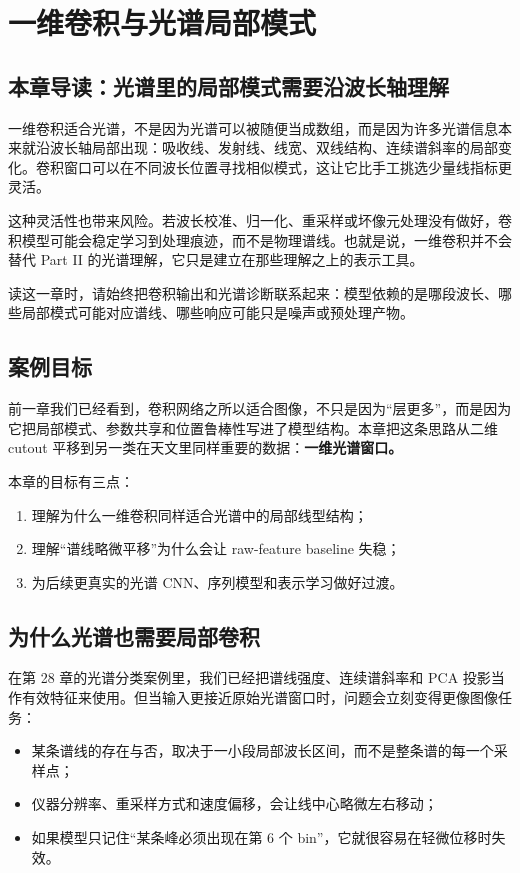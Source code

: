 \chapter{一维卷积与光谱局部模式}

\section{本章导读：光谱里的局部模式需要沿波长轴理解}

一维卷积适合光谱，不是因为光谱可以被随便当成数组，而是因为许多光谱信息本来就沿波长轴局部出现：吸收线、发射线、线宽、双线结构、连续谱斜率的局部变化。卷积窗口可以在不同波长位置寻找相似模式，这让它比手工挑选少量线指标更灵活。

这种灵活性也带来风险。若波长校准、归一化、重采样或坏像元处理没有做好，卷积模型可能会稳定学习到处理痕迹，而不是物理谱线。也就是说，一维卷积并不会替代 Part II 的光谱理解，它只是建立在那些理解之上的表示工具。

读这一章时，请始终把卷积输出和光谱诊断联系起来：模型依赖的是哪段波长、哪些局部模式可能对应谱线、哪些响应可能只是噪声或预处理产物。

\section{案例目标}

前一章我们已经看到，卷积网络之所以适合图像，不只是因为“层更多”，而是因为它把局部模式、参数共享和位置鲁棒性写进了模型结构。本章把这条思路从二维 cutout 平移到另一类在天文里同样重要的数据：\textbf{一维光谱窗口。}

本章的目标有三点：

\begin{enumerate}
    \item 理解为什么一维卷积同样适合光谱中的局部线型结构；
    \item 理解“谱线略微平移”为什么会让 raw-feature baseline 失稳；
    \item 为后续更真实的光谱 CNN、序列模型和表示学习做好过渡。
\end{enumerate}

\section{为什么光谱也需要局部卷积}

在第 28 章的光谱分类案例里，我们已经把谱线强度、连续谱斜率和 PCA 投影当作有效特征来使用。但当输入更接近原始光谱窗口时，问题会立刻变得更像图像任务：

\begin{itemize}
    \item 某条谱线的存在与否，取决于一小段局部波长区间，而不是整条谱的每一个采样点；
    \item 仪器分辨率、重采样方式和速度偏移，会让线中心略微左右移动；
    \item 如果模型只记住“某条峰必须出现在第 6 个 bin”，它就很容易在轻微位移时失效。
\end{itemize}

